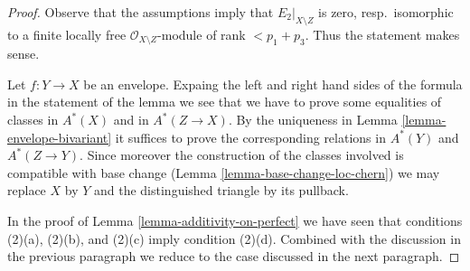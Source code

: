 \begin{proof}
Observe that the assumptions imply that $E_2|_{X \setminus Z}$ is zero,
resp.\ isomorphic to a finite locally free $\mathcal{O}_{X \setminus Z}$-module
of rank $< p_1 + p_3$. Thus the statement makes sense.

\medskip\noindent
Let $f : Y \to X$ be an envelope. Expaing the left and right hand sides
of the formula in the statement of the lemma we see that we have to prove
some equalities of classes in $A^*(X)$ and in $A^*(Z \to X)$. By the
uniqueness in Lemma \ref{lemma-envelope-bivariant} it suffices to prove the
corresponding relations in $A^*(Y)$ and $A^*(Z \to Y)$. Since moreover
the construction of the classes involved is compatible with base change
(Lemma \ref{lemma-base-change-loc-chern}) we may replace $X$ by $Y$
and the distinguished triangle by its pullback.

\medskip\noindent
In the proof of Lemma \ref{lemma-additivity-on-perfect} we have
seen that conditions (2)(a), (2)(b), and (2)(c) imply condition
(2)(d). Combined with the discussion in the previous paragraph we
reduce to the case discussed in the next paragraph.


\end{proof}
